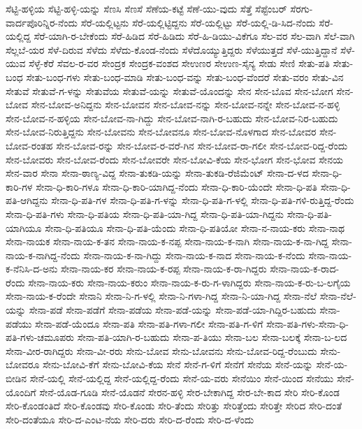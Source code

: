 ಸೆಟ್ಟಿ-ಹಳ್ಳಿಯ
ಸೆಟ್ಟಿ-ಹಳ್ಳಿ-ಯನ್ನು
ಸೆಣಸಿ
ಸೆಣಸೆ
ಸೆಣೆಯ-ಕಟ್ಟೆ
ಸೆಣೆ-ಯು-ವುದು
ಸೆತ್ತೆ
ಸೆಪ್ಟೆಂಬರ್
ಸೆರಗು-ವಾರ್ದಪೊರಿನ್ನಿರ-ನೆಂದು
ಸೆರೆ-ಯಲ್ಲಿಟ್ಟನು
ಸೆರೆ-ಯಲ್ಲಿಟ್ಟಿದ್ದನು
ಸೆರೆ-ಯಲ್ಲಿಟ್ಟು
ಸೆರೆ-ಯಲ್ಲಿ-ಡಿ-ಸಿದ-ನೆಂದು
ಸೆರೆ-ಯಲ್ಲಿದ್ದ
ಸೆರೆ-ಯಾಗಿ-ರ-ಬೇಕೆಂದು
ಸೆರೆ-ಹಿಡಿದ
ಸೆರೆ-ಹಿಡಿದು
ಸೆರೆ-ಹಿ-ಡಿಯು-ವಿಕೆಗೂ
ಸೆಲ-ವರ
ಸೆಲ-ವಾಗಿ
ಸೆಲೆ-ವಾಗಿ
ಸೆಲ್ಲಬೆ-ಯರ
ಸೆಳೆ-ದಿರುವ
ಸೆಳೆದು
ಸೆಳೆದು-ಕೊಂಡ-ನೆಂದು
ಸೆಳೆದೊಯ್ಯುತ್ತಿದ್ದರು
ಸೆಳೆಯುತ್ತದೆ
ಸೆಳೆ-ಯುತ್ತಿದ್ದಾನೆ
ಸೆಳೆ-ಯುವ
ಸೆಳ್ಳೆ-ಕೆರೆ
ಸೆವಲ-ರ-ವರ
ಸೇಂದ್ರಕ
ಸೇಂದ್ರಕ-ವಂಶದ
ಸೇಉಣರ
ಸೇಉಣ-ಸೈನ್ಯ
ಸೇಡು
ಸೇಣಿ
ಸೇತು-ಪತಿ
ಸೇತು-ಬಂಧ
ಸೇತು-ಬಂಧ-ಗಳು
ಸೇತು-ಬಂಧ-ಮಾಡಿ
ಸೇತು-ಬಂಧ-ವನ್ನು
ಸೇತು-ಬಂಧ-ವೆಂದರೆ
ಸೇತು-ವರಂ
ಸೇತು-ವಿನ
ಸೇತುವೆ
ಸೇತುವೆ-ಗ-ಳನ್ನು
ಸೇತುವೆಯ
ಸೇತುವೆ-ಯನ್ನು
ಸೇತುವೆ-ಯೊಂದನ್ನು
ಸೇನ
ಸೇನ-ಬೊವ
ಸೇನ-ಬೋಗ
ಸೇನ-ಬೋವ
ಸೇನ-ಬೋವ-ಅನಿದ್ದನು
ಸೇನ-ಬೋವನ
ಸೇನ-ಬೋವ-ನನ್ನು
ಸೇನ-ಬೋವ-ನನ್ನೇ
ಸೇನ-ಬೋವ-ನ-ಹಳ್ಳಿ
ಸೇನ-ಬೋವ-ನ-ಹಳ್ಳಿಯ
ಸೇನ-ಬೋವ-ನಾ-ಗಿದ್ದು
ಸೇನ-ಬೋವ-ನಾಗಿ-ರ-ಬಹುದು
ಸೇನ-ಬೋವ-ನಿರ-ಬಹುದು
ಸೇನ-ಬೋವ-ನಿರುತ್ತಿದ್ದನು
ಸೇನ-ಬೋವನು
ಸೇನ-ಬೋವನೂ
ಸೇನ-ಬೋವ-ನೊಳಗಾದ
ಸೇನ-ಬೋವರ
ಸೇನ-ಬೋವ-ರಂತಹ
ಸೇನ-ಬೋವ-ರನ್ನು
ಸೇನ-ಬೋವ-ರ-ವರೆ-ಗಿನ
ಸೇನ-ಬೋವ-ರಾ-ಗಲೀ
ಸೇನ-ಬೋವ-ರಿದ್ದ-ರೆಂದು
ಸೇನ-ಬೋವರು
ಸೇನ-ಬೋವ-ರೆಂದು
ಸೇನ-ಬೋವರೇ
ಸೇನ-ಬೋವಿ-ಕೆಯ
ಸೇನ-ಭೋಗ
ಸೇನ-ಭೋವ
ಸೇನಯ
ಸೇನ-ವಾರ
ಸೇನಾ
ಸೇನಾ-ಠಾಣ್ಯ-ವಿದ್ದ
ಸೇನಾ-ತುಕಡಿ-ಯನ್ನು
ಸೇನಾ-ತುಕಡಿ-ರೆಜಿಮೆಂಟ್
ಸೇನಾ-ದ-ಳದ
ಸೇನಾ-ಧಿ-ಕಾರಿ-ಗಳ
ಸೇನಾ-ಧಿ-ಕಾರಿ-ಗಳೂ
ಸೇನಾ-ಧಿ-ಕಾರಿ-ಯಾಗಿದ್ದ-ನೆಂದು
ಸೇನಾ-ಧಿ-ಕಾರಿ-ಯೆಂದೇ
ಸೇನಾ-ಧಿ-ಪತಿ
ಸೇನಾ-ಧಿ-ಪತಿ-ಆಗಿದ್ದನು
ಸೇನಾ-ಧಿ-ಪತಿ-ಗಳ
ಸೇನಾ-ಧಿ-ಪತಿ-ಗ-ಳನ್ನು
ಸೇನಾ-ಧಿ-ಪತಿ-ಗ-ಳಲ್ಲಿ
ಸೇನಾ-ಧಿ-ಪತಿ-ಗಳಿ-ರುತ್ತಿದ್ದ-ರೆಂದು
ಸೇನಾ-ಧಿ-ಪತಿ-ಗಳು
ಸೇನಾ-ಧಿ-ಪತಿಯ
ಸೇನಾ-ಧಿ-ಪತಿ-ಯಾ-ಗಿದ್ದ
ಸೇನಾ-ಧಿ-ಪತಿ-ಯಾ-ಗಿದ್ದನು
ಸೇನಾ-ಧಿ-ಪತಿ-ಯಾಗಿಯೂ
ಸೇನಾ-ಧಿ-ಪತಿಯೂ
ಸೇನಾ-ಧಿ-ಪತಿ-ಯೆಂದು
ಸೇನಾ-ಧಿ-ಪತಿಯೋ
ಸೇನಾ-ನ-ನಾಯ-ಕರು
ಸೇನಾ-ನಾಥ
ಸೇನಾ-ನಾಯಕ
ಸೇನಾ-ನಾಯ-ಕ-ತನ
ಸೇನಾ-ನಾಯ-ಕ-ನಪ್ಪ
ಸೇನಾ-ನಾಯ-ಕ-ನಾಗಿ
ಸೇನಾ-ನಾಯ-ಕ-ನಾ-ಗಿದ್ದ
ಸೇನಾ-ನಾಯ-ಕ-ನಾಗಿದ್ದ-ನೆಂದು
ಸೇನಾ-ನಾಯ-ಕ-ನಾ-ಗಿದ್ದು
ಸೇನಾ-ನಾಯ-ಕ-ನಾದ
ಸೇನಾ-ನಾಯ-ಕ-ನೆಂದು
ಸೇನಾ-ನಾಯ-ಕ-ನೆನಿಸಿ-ದ-ಅನು
ಸೇನಾ-ನಾಯ-ಕರ
ಸೇನಾ-ನಾಯ-ಕ-ರಪ್ಪ
ಸೇನಾ-ನಾಯ-ಕ-ರಾ-ಗಿದ್ದರು
ಸೇನಾ-ನಾಯ-ಕ-ರಾದ-ರೆಂದು
ಸೇನಾ-ನಾಯ-ಕರು
ಸೇನಾ-ನಾಯ-ಕರುಂ
ಸೇನಾ-ನಾಯ-ಕ-ರು-ಗ-ಳಾಗಿದ್ದರು
ಸೇನಾ-ನಾಯ-ಕ-ರು-ಬ-ಲಗೈಯ
ಸೇನಾ-ನಾಯ-ಕ-ರೆಂದೇ
ಸೇನಾನಿ
ಸೇನಾ-ನಿ-ಗ-ಳಲ್ಲಿ
ಸೇನಾ-ನಿ-ಗಳಾ-ಗಿದ್ದ
ಸೇನಾ-ನಿ-ಯಾ-ಗಿದ್ದ
ಸೇನಾ-ನೆಲೆ
ಸೇನಾ-ನೆಲೆ-ಯನ್ನು
ಸೇನಾ-ಪಡೆ
ಸೇನಾ-ಪಡೆಗೆ
ಸೇನಾ-ಪಡೆಯ
ಸೇನಾ-ಪಡೆ-ಯನ್ನು
ಸೇನಾ-ಪಡೆ-ಯಾ-ಗಿದ್ದಿರ-ಬಹುದು
ಸೇನಾ-ಪಡೆಯು
ಸೇನಾ-ಪಡೆ-ಯೆಂದೂ
ಸೇನಾ-ಪತಿ
ಸೇನಾ-ಪತಿ-ಗಳಾ-ಗಲೀ
ಸೇನಾ-ಪತಿ-ಗ-ಳಿಗೆ
ಸೇನಾ-ಪತಿ-ಗಳು-ಸೇನಾ-ಧಿ-ಪತಿ-ಗಳು-ಚಮೂಪರು
ಸೇನಾ-ಪತಿ-ಯಾಗಿ-ರ-ಬಹುದು
ಸೇನಾ-ಪ-ತಿಯು
ಸೇನಾ-ಬಲ
ಸೇನಾ-ಬಲಕ್ಕೆ
ಸೇನಾ-ಬ-ಲದ
ಸೇನಾ-ವೀರ-ರಾಗಿದ್ದರು
ಸೇನಾ-ವೀ-ರರು
ಸೇನು-ಬೋವ
ಸೇನು-ಬೋವನು
ಸೇನು-ಬೋವ-ರಿದ್ದ-ರೆಂಬುದು
ಸೇನು-ಬೋವರೂ
ಸೇನು-ಬೋವಿ-ಕೆಗೆ
ಸೇನು-ಬೋವಿ-ಕೆಯ
ಸೇನೆ
ಸೇನೆ-ಗ-ಳಿಗೆ
ಸೇನೆಗೆ
ಸೇನೆಯ
ಸೇನೆ-ಯನ್ನು
ಸೇನೆ-ಯ-ಬೀಡಿನ
ಸೇನೆ-ಯಲ್ಲಿ
ಸೇನೆ-ಯಲ್ಲಿದ್ದ
ಸೇನೆ-ಯಲ್ಲಿದ್ದ-ರೆಂದು
ಸೇನೆ-ಯ-ವರು
ಸೇನೆಯಿಂ
ಸೇನೆ-ಯಿಂದ
ಸೇನೆಯು
ಸೇನೆ-ಯೊಂದಿಗೆ
ಸೇನೆ-ಯೊಡ-ಗೂಡಿ
ಸೇನೆ-ಯೊಡನೆ
ಸೇರನ-ಹಳ್ಳಿ
ಸೇರ-ಬೇಕಾಗಿದ್ದ
ಸೇರ-ಬೇ-ಕಾದ
ಸೇರಿ
ಸೇರಿ-ಕೊಂಡ
ಸೇರಿ-ಕೊಂಡಂತಿದೆ
ಸೇರಿ-ಕೊಂಡವು
ಸೇರಿ-ಕೊಂಡು
ಸೇರಿ-ತೆಂದು
ಸೇರಿತ್ತು
ಸೇರಿತ್ತೆಂದು
ಸೇರಿತ್ತೇ
ಸೇರಿದ
ಸೇರಿ-ದಂತೆ
ಸೇರಿ-ದಂತೆಯೂ
ಸೇರಿ-ದ-ಎಂಟ-ನೆಯ
ಸೇರಿ-ದರು
ಸೇರಿ-ದ-ರೆಂದು
ಸೇರಿ-ದ-ಳೆಂದು
